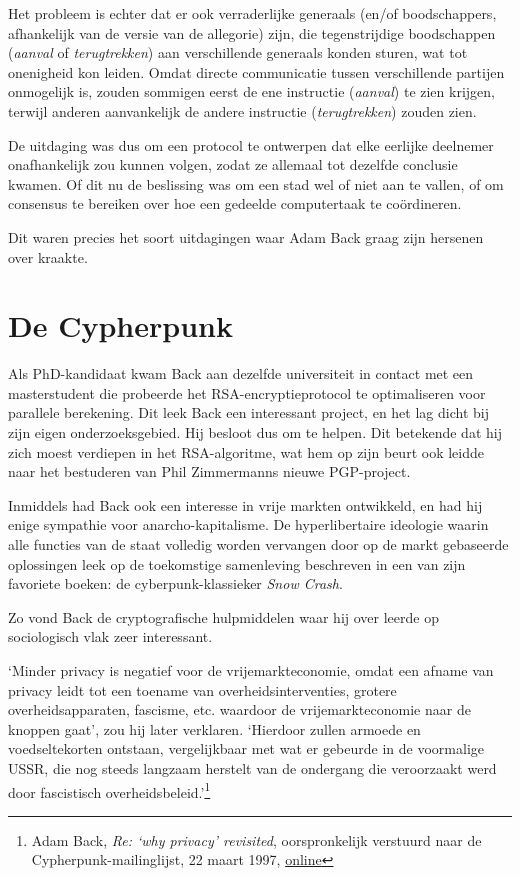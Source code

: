 \documentclass[
  a5paper,
  smalldemyvopaper,11pt,twoside,onecolumn,openright,extrafontsizes,
hidelinks]{memoir}
\begin{document}
Het probleem is echter dat er ook verraderlijke generaals (en/of
boodschappers, afhankelijk van de versie van de allegorie) zijn, die
tegenstrijdige boodschappen (\emph{aanval} of \emph{terugtrekken}) aan
verschillende generaals konden sturen, wat tot onenigheid kon leiden.
Omdat directe communicatie tussen verschillende partijen onmogelijk is,
zouden sommigen eerst de ene instructie (\emph{aanval}) te zien krijgen,
terwijl anderen aanvankelijk de andere instructie (\emph{terugtrekken})
zouden zien.

De uitdaging was dus om een protocol te ontwerpen dat elke eerlijke
deelnemer onafhankelijk zou kunnen volgen, zodat ze allemaal tot
dezelfde conclusie kwamen. Of dit nu de beslissing was om een stad wel
of niet aan te vallen, of om consensus te bereiken over hoe een gedeelde
computertaak te coördineren.

Dit waren precies het soort uitdagingen waar Adam Back graag zijn
hersenen over kraakte.

\section{De Cypherpunk}\label{de-cypherpunk}

Als PhD-kandidaat kwam Back aan dezelfde universiteit in contact met een
masterstudent die probeerde het RSA-encryptieprotocol te optimaliseren
voor parallele berekening. Dit leek Back een interessant project, en het
lag dicht bij zijn eigen onderzoeksgebied. Hij besloot dus om te helpen.
Dit betekende dat hij zich moest verdiepen in het RSA-algoritme, wat hem
op zijn beurt ook leidde naar het bestuderen van Phil Zimmermanns nieuwe
PGP-project.

Inmiddels had Back ook een interesse in vrije markten ontwikkeld, en had
hij enige sympathie voor anarcho-kapitalisme. De hyperlibertaire
ideologie waarin alle functies van de staat volledig worden vervangen
door op de markt gebaseerde oplossingen leek op de toekomstige
samenleving beschreven in een van zijn favoriete boeken: de
cyberpunk-klassieker \emph{Snow Crash}.

Zo vond Back de cryptografische hulpmiddelen waar hij over leerde op
sociologisch vlak zeer interessant.

`Minder privacy is negatief voor de vrijemarkteconomie, omdat een afname
van privacy leidt tot een toename van overheidsinterventies, grotere
overheidsapparaten, fascisme, etc. waardoor de vrijemarkteconomie naar
de knoppen gaat', zou hij later verklaren. `Hierdoor zullen armoede en
voedseltekorten ontstaan, vergelijkbaar met wat er gebeurde in de
voormalige USSR, die nog steeds langzaam herstelt van de ondergang die
veroorzaakt werd door fascistisch overheidsbeleid.'\footnote{Adam Back,
  \emph{Re: `why privacy' revisited}, oorspronkelijk verstuurd naar de
  Cypherpunk-mailinglijst, 22 maart 1997,
  \href{https://cypherpunks.venona.com/date/1997/03/msg00586.html}{online}}
\end{document}
